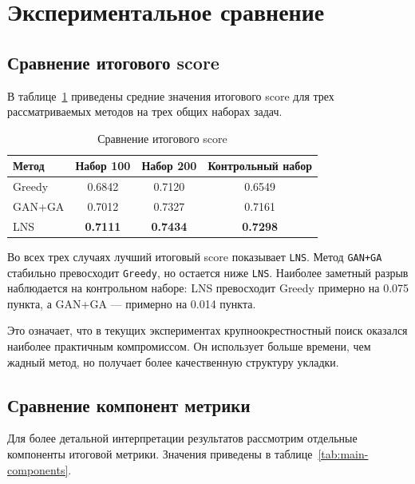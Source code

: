 \documentclass[14pt,a4paper]{extarticle}
\begin{document}
\pagebreak

\section{Экспериментальное сравнение}

\subsection{Сравнение итогового score}

В таблице~\ref{tab:main-score} приведены средние значения итогового score для трех рассматриваемых методов на трех общих наборах задач.

\begin{table}[H]
\centering
\caption{Сравнение итогового score}
\label{tab:main-score}
\begin{tabular}{lccc}
\toprule
\textbf{Метод} & \textbf{Набор 100} & \textbf{Набор 200} & \textbf{Контрольный набор} \\
\midrule
Greedy & 0.6842 & 0.7120 & 0.6549 \\
GAN+GA & 0.7012 & 0.7327 & 0.7161 \\
LNS & \textbf{0.7111} & \textbf{0.7434} & \textbf{0.7298} \\
\bottomrule
\end{tabular}
\end{table}

Во всех трех случаях лучший итоговый score показывает \texttt{LNS}. Метод \texttt{GAN+GA} стабильно превосходит \texttt{Greedy}, но остается ниже \texttt{LNS}. Наиболее заметный разрыв наблюдается на контрольном наборе: LNS превосходит Greedy примерно на 0.075 пункта, а GAN+GA --- примерно на 0.014 пункта.

Это означает, что в текущих экспериментах крупноокрестностный поиск оказался наиболее практичным компромиссом. Он использует больше времени, чем жадный метод, но получает более качественную структуру укладки.

\subsection{Сравнение компонент метрики}

Для более детальной интерпретации результатов рассмотрим отдельные компоненты итоговой метрики. Значения приведены в таблице~\ref{tab:main-components}.
\end{document}
